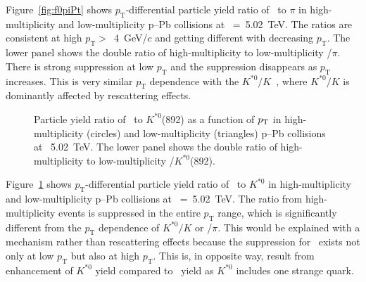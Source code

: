 Figure~\ref{fig:f0piPt} shows $p_{\mathrm{T}}$-differential particle yield ratio of \fzero~to $\pi$ in high-multiplicity and low-multiplicity p--Pb collisions at \snn~=~5.02~TeV. The ratios are consistent at high $p_{\mathrm{T}}>$~4~GeV/$c$ and getting different with decreasing $p_{\mathrm{T}}$. The lower panel shows the double ratio of high-multiplicity to low-multiplicity \fzero/$\pi$. There is strong suppression at low $p_{\mathrm{T}}$ and the suppression disappears as $p_{\mathrm{T}}$ increases. This is very similar $p_{\mathrm{T}}$ dependence with the $K^{*0}/K$~\cite{ALICE:2019etb}, where $K^{*0}/K$ is dominantly affected by rescattering effects.

\begin{figure}[!hbt]
	\centering
	\caption{ Particle yield ratio of \fzero~to $K^{*0}$(892) as a function of $p_{\rm{T}}$ in high-multiplicity (circles) and low-multiplicity (triangles) p--Pb collisions at \snn~5.02~TeV. The lower panel shows the double ratio of high-multiplicity to low-multiplicity \fzero/$K^{*0}$(892).  }
	\label{fig:f0KsPt}
\end{figure}

Figure~\ref{fig:f0KsPt} shows $p_{\mathrm{T}}$-differential particle yield ratio of \fzero~to $K^{*0}$ in high-multiplicity and low-multiplicity p--Pb collisions at \snn~=~5.02~TeV. The ratio from high-multiplicity events is suppressed in the entire $p_{\mathrm{T}}$ range, which is significantly different from the $p_{\mathrm{T}}$ dependence of $K^{*0}/K$ or \fzero/$\pi$. This would be explained with a mechanism rather than rescattering effects because the suppression for \fzero~exists not only at low $p_{\mathrm{T}}$ but also at high $p_{\mathrm{T}}$. This is, in opposite way, result from enhancement of $K^{*0}$ yield compared to \fzero~yield as $K^{*0}$ includes one strange quark.

